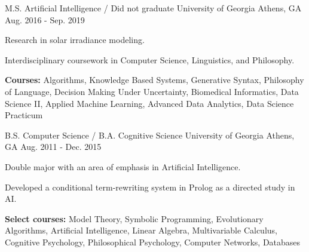 \begin{cventries}

\cventry
{M.S. Artificial Intelligence / Did not graduate}
{University of Georgia}
{Athens, GA}
{Aug. 2016 - Sep. 2019}
{\begin{cvitems}
    \item {Research in solar irradiance modeling.}
    \item {Interdisciplinary coursework in Computer Science, Linguistics, and Philosophy.}
    \item {\textbf{Courses:} Algorithms, Knowledge Based Systems, Generative Syntax, Philosophy of Language, Decision Making Under Uncertainty, Biomedical Informatics, Data Science II, Applied Machine Learning, Advanced Data Analytics, Data Science Practicum}
\end{cvitems}}

\cventry
{B.S. Computer Science / B.A. Cognitive Science}
{University of Georgia}
{Athens, GA}
{Aug. 2011 - Dec. 2015}
{\begin{cvitems}
    \item {Double major with an area of emphasis in Artificial Intelligence.}
    \item {Developed a conditional term-rewriting system in Prolog as a directed study in AI.}
    \item {\textbf{Select courses:} Model Theory, Symbolic Programming, Evolutionary Algorithms, Artificial Intelligence, Linear Algebra, Multivariable Calculus, Cognitive Psychology, Philosophical Psychology, Computer Networks, Databases}
\end{cvitems}}

\end{cventries}
